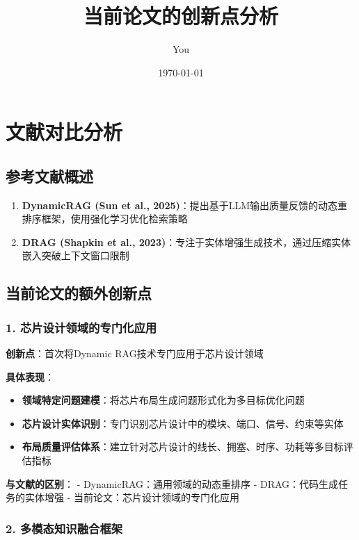 \documentclass{ctexart}
\title{当前论文的创新点分析}
\author{You}
\date{\today}
\begin{document}
\maketitle

\section{文献对比分析}

\subsection{参考文献概述}

\begin{enumerate}
    \item \textbf{DynamicRAG (Sun et al., 2025)}：提出基于LLM输出质量反馈的动态重排序框架，使用强化学习优化检索策略
    \item \textbf{DRAG (Shapkin et al., 2023)}：专注于实体增强生成技术，通过压缩实体嵌入突破上下文窗口限制
\end{enumerate}

\subsection{当前论文的额外创新点}

\subsubsection{1. 芯片设计领域的专门化应用}

\textbf{创新点}：首次将Dynamic RAG技术专门应用于芯片设计领域

\textbf{具体表现}：
\begin{itemize}
    \item \textbf{领域特定问题建模}：将芯片布局生成问题形式化为多目标优化问题
    \item \textbf{芯片设计实体识别}：专门识别芯片设计中的模块、端口、信号、约束等实体
    \item \textbf{布局质量评估体系}：建立针对芯片设计的线长、拥塞、时序、功耗等多目标评估指标
\end{itemize}

\textbf{与文献的区别}：
- DynamicRAG：通用领域的动态重排序
- DRAG：代码生成任务的实体增强
- 当前论文：芯片设计领域的专门化应用

\subsubsection{2. 多模态知识融合框架}
\end{document}
